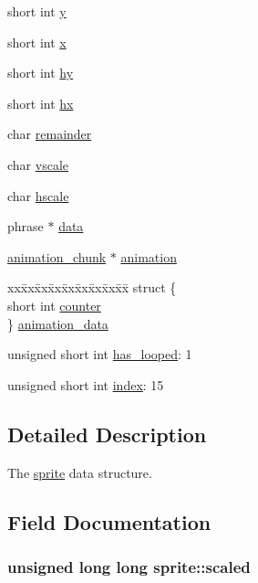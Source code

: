 \begin{CompactItemize}
\begin{tabbing}
\end{tabbing}\item 
short int \hyperlink{structsprite_a8dc6f3d689443af5ec63fd4d90ed519}{y}
\item 
short int \hyperlink{structsprite_5b48711690e0d8fd0b25a82a18756816}{x}
\item 
short int \hyperlink{structsprite_3aef5a02d3b7ac32229ae776b468b278}{hy}
\item 
short int \hyperlink{structsprite_2b3011ec3ce10cc3211fb7bdc17d3e8b}{hx}
\item 
char \hyperlink{structsprite_508c1537b3f534015567605adc0178c1}{remainder}
\item 
char \hyperlink{structsprite_a5b542ecac2fc466bcc651cd5053096e}{vscale}
\item 
char \hyperlink{structsprite_85b8ccf657c3b74535a497b57adf47c2}{hscale}
\item 
phrase $\ast$ \hyperlink{structsprite_b69855ef4624739b70f9879bc51014b4}{data}
\item 
\hyperlink{structanimation__chunk}{animation\_\-chunk} $\ast$ \hyperlink{structsprite_988af45ecb82acc80fc1e3394abc2b9b}{animation}
\item 
\begin{tabbing}
xx\=xx\=xx\=xx\=xx\=xx\=xx\=xx\=xx\=\kill
struct \{\\
\>short int \hyperlink{structsprite_fa753f2b34391a607597d94eb97297ab}{counter}\\
\} \hyperlink{structsprite_86c7732d824f595ebbb85461e5230485}{animation\_data}\\

\end{tabbing}\item 
unsigned short int \hyperlink{structsprite_5be8ecba0a815b906800a772c8b27403}{has\_\-looped}: 1
\item 
unsigned short int \hyperlink{structsprite_f328047fc796240e70e71bff779c00eb}{index}: 15
\end{CompactItemize}


\subsection{Detailed Description}
The \hyperlink{structsprite}{sprite} data structure. 

\subsection{Field Documentation}
\hypertarget{structsprite_a394695544784a6b64e10a5048593387}{
\subsubsection{\setlength{\rightskip}{0pt plus 5cm}unsigned long long {\bf sprite::scaled}}}
\label{structsprite_a394695544784a6b64e10a5048593387}


